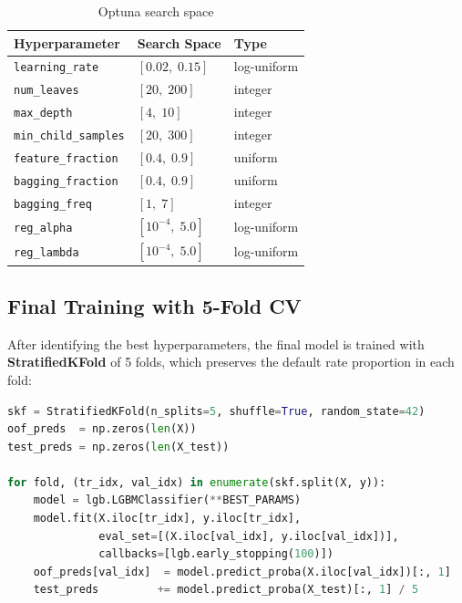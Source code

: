 \documentclass[12pt, a4paper]{article}
\begin{document}
\begin{table}[H]
\centering
\begin{tabular}{lll}
\toprule
\textbf{Hyperparameter} & \textbf{Search Space} & \textbf{Type} \\
\midrule
\texttt{learning\_rate}      & $[0.02,\; 0.15]$   & log-uniform \\
\texttt{num\_leaves}         & $[20,\; 200]$       & integer \\
\texttt{max\_depth}          & $[4,\; 10]$         & integer \\
\texttt{min\_child\_samples} & $[20,\; 300]$       & integer \\
\texttt{feature\_fraction}   & $[0.4,\; 0.9]$      & uniform \\
\texttt{bagging\_fraction}   & $[0.4,\; 0.9]$      & uniform \\
\texttt{bagging\_freq}       & $[1,\; 7]$          & integer \\
\texttt{reg\_alpha}          & $[10^{-4},\; 5.0]$  & log-uniform \\
\texttt{reg\_lambda}         & $[10^{-4},\; 5.0]$  & log-uniform \\
\bottomrule
\end{tabular}
\caption{Optuna search space}
\end{table}

\subsection{Final Training with 5-Fold CV}

After identifying the best hyperparameters, the final model is trained with
\textbf{StratifiedKFold} of 5 folds, which preserves the default rate proportion in
each fold:

\begin{lstlisting}[language=Python, caption={Stratified cross-validation training}]
skf = StratifiedKFold(n_splits=5, shuffle=True, random_state=42)
oof_preds  = np.zeros(len(X))
test_preds = np.zeros(len(X_test))

for fold, (tr_idx, val_idx) in enumerate(skf.split(X, y)):
    model = lgb.LGBMClassifier(**BEST_PARAMS)
    model.fit(X.iloc[tr_idx], y.iloc[tr_idx],
              eval_set=[(X.iloc[val_idx], y.iloc[val_idx])],
              callbacks=[lgb.early_stopping(100)])
    oof_preds[val_idx]  = model.predict_proba(X.iloc[val_idx])[:, 1]
    test_preds         += model.predict_proba(X_test)[:, 1] / 5
\end{lstlisting}
\end{document}
